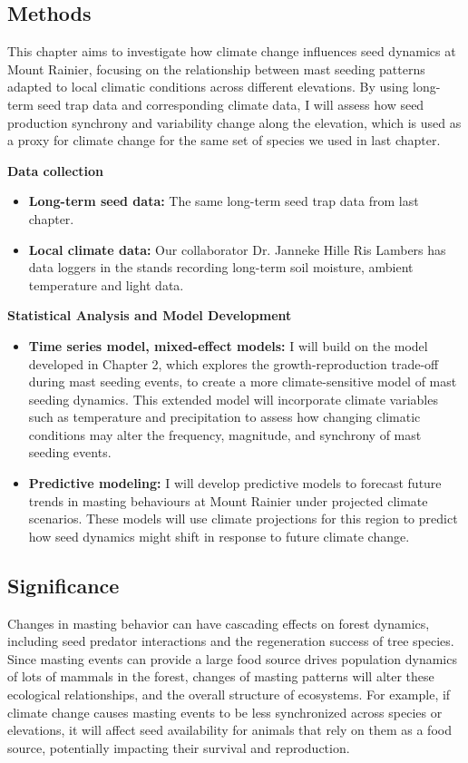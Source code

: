 \documentclass[11pt,letter]{article}
\begin{document}
\subsection{Methods}
This chapter aims to investigate how climate change influences seed dynamics at Mount Rainier, focusing on the relationship between mast seeding patterns adapted to local climatic conditions across different elevations. By using long-term seed trap data and corresponding climate data, I will assess how seed production synchrony and variability change along the elevation, which is used as a proxy for climate change for the same set of species we used in last chapter.\par
\textbf{Data collection}
\begin{itemize}
\item\textbf{Long-term seed data:} The same long-term seed trap data from last chapter.
\item\textbf{Local climate data:}  Our collaborator Dr. Janneke Hille Ris Lambers has data loggers in the stands recording long-term soil moisture, ambient temperature and light data.
\end{itemize}
\textbf{Statistical Analysis and Model Development}
\begin{itemize}
\item\textbf{Time series model, mixed-effect models:} I will build on the model developed in Chapter 2, which explores the growth-reproduction trade-off during mast seeding events, to create a more climate-sensitive model of mast seeding dynamics. This extended model will incorporate climate variables such as temperature and precipitation to assess how changing climatic conditions may alter the frequency, magnitude, and synchrony of mast seeding events.
\item\textbf{Predictive modeling:} I will develop predictive models to forecast future trends in masting behaviours at Mount Rainier under projected climate scenarios. These models will use climate projections for this region to predict how seed dynamics might shift in response to future climate change.
\end{itemize}
\subsection{Significance}
Changes in masting behavior can have cascading effects on forest dynamics, including seed predator interactions and the regeneration success of tree species. Since masting events can provide a large food source drives population dynamics of lots of mammals in the forest, changes of masting patterns will alter these ecological relationships, and the overall structure of ecosystems. For example, if climate change causes masting events to be less synchronized across species or elevations, it will affect seed availability for animals that rely on them as a food source, potentially impacting their survival and reproduction.\par
\end{document}
